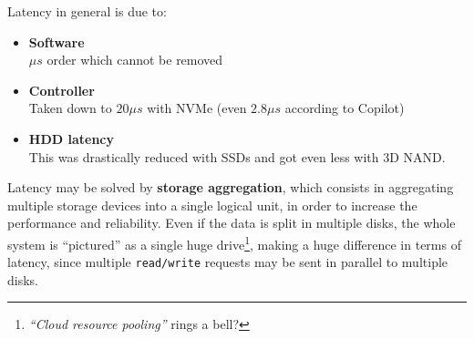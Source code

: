 Latency in general is due to:
\begin{itemize}
   \item \textbf{Software}\\
   $\mu s$ order which cannot be removed
   \item \textbf{Controller}\\
   Taken down to $20\mu s$ with NVMe (even $2.8\mu s$ according to Copilot)
   \item \textbf{HDD latency}\\
   This was drastically reduced with SSDs and got even less with 3D NAND.
\end{itemize}
Latency may be solved by \textbf{storage aggregation}, which consists in aggregating multiple storage devices into a single logical unit, in order to increase the performance and reliability.
Even if the data is split in multiple disks, the whole system is ``pictured'' as a single huge drive\footnote{\textit{``Cloud resource pooling''} rings a bell?}, making a huge difference in terms of latency, since multiple \texttt{read/write} requests may be sent in parallel to multiple disks.

\newpage
